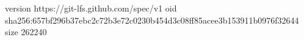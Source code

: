 version https://git-lfs.github.com/spec/v1
oid sha256:657bf296b37ebc2c72b3e72c0230b454d3c08ff85acee3b153911b0976f32644
size 262240
